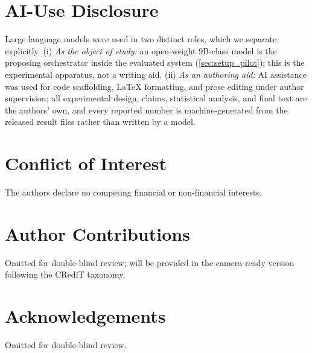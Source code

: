 \documentclass[conference]{IEEEtran}
\begin{document}
\section*{AI-Use Disclosure}
Large language models were used in two distinct roles, which we separate explicitly. (i) \emph{As the object of study:} an open-weight 9B-class model is the proposing orchestrator inside the evaluated system (\cref{sec:setup_pilot}); this is the experimental apparatus, not a writing aid. (ii) \emph{As an authoring aid:} AI assistance was used for code scaffolding, LaTeX formatting, and prose editing under author supervision; all experimental design, claims, statistical analysis, and final text are the authors' own, and every reported number is machine-generated from the released result files rather than written by a model.

\section*{Conflict of Interest}
The authors declare no competing financial or non-financial interests.

\section*{Author Contributions}
Omitted for double-blind review; will be provided in the camera-ready version following the CRediT taxonomy.

\section*{Acknowledgements}
Omitted for double-blind review.
\end{document}
